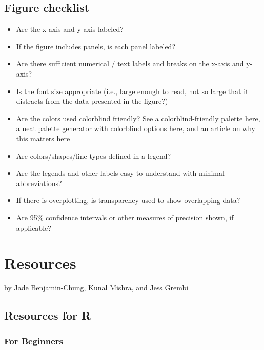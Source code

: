 \documentclass[
]{book}
\providecommand{\tightlist}{%
  \setlength{\itemsep}{0pt}\setlength{\parskip}{0pt}}
\begin{document}
\section{Figure checklist}\label{figure-checklist}

\begin{itemize}
\tightlist
\item
  Are the x-axis and y-axis labeled?
\item
  If the figure includes panels, is each panel labeled?
\item
  Are there sufficient numerical / text labels and breaks on the x-axis and y-axis?
\item
  Is the font size appropriate (i.e., large enough to read, not so large that it distracts from the data presented in the figure?)
\item
  Are the colors used colorblind friendly? See a colorblind-friendly palette \href{http://www.cookbook-r.com/Graphs/Colors_(ggplot2)/\#a-colorblind-friendly-palette}{here}, a neat palette generator with colorblind options \href{https://medialab.github.io/iwanthue/?utm_source=Nature+Briefing&utm_campaign=2c68711076-briefing-dy-20211006&utm_medium=email&utm_term=0_c9dfd39373-2c68711076-44335685}{here}, and an article on why this matters \href{https://www.nature.com/articles/d41586-021-02696-z}{here}
\item
  Are colors/shapes/line types defined in a legend?
\item
  Are the legends and other labels easy to understand with minimal abbreviations?
\item
  If there is overplotting, is transparency used to show overlapping data?
\item
  Are 95\% confidence intervals or other measures of precision shown, if applicable?
\end{itemize}

\chapter{Resources}\label{resources}

by Jade Benjamin-Chung, Kunal Mishra, and Jess Grembi

\section{Resources for R}\label{resources-for-r}

\subsection{For Beginners}\label{for-beginners}
\end{document}
